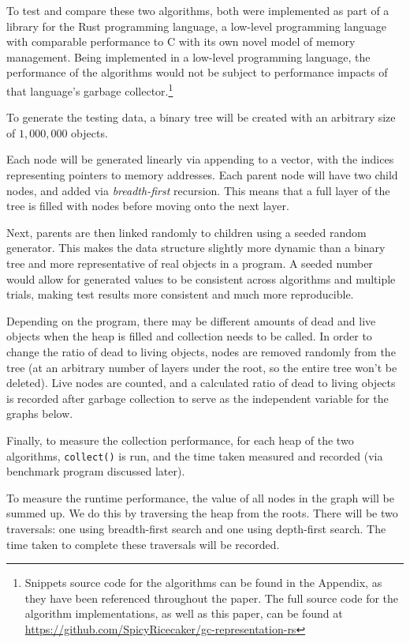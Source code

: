 \documentclass[index]{subfiles}
\begin{document}
To test and compare these two algorithms, both were implemented as part of a library for the Rust programming language, a low-level programming language with comparable performance to C with its own novel model of memory management. Being implemented in a low-level programming language, the performance of the algorithms would not be subject to performance impacts of that language's garbage collector.\footnote{Snippets source code for the algorithms can be found in the Appendix, as they have been referenced throughout the paper. The full source code for the algorithm implementations, as well as this paper, can be found at \href{https://github.com/SpicyRicecaker/gc-representation-rs}{https://github.com/SpicyRicecaker/gc-representation-rs}}

To generate the testing data, a binary tree will be created with an arbitrary size of \(1,000,000\) objects.

Each node will be generated linearly via appending to a vector, with the indices representing pointers to memory addresses. Each parent node will have two child nodes, and added via \textit{breadth-first} recursion. This means that a full layer of the tree is filled with nodes before moving onto the next layer. %

Next, parents are then linked randomly to children using a seeded random generator. This makes the data structure slightly more dynamic than a binary tree and more representative of real objects in a program. A seeded number would allow for generated values to be consistent across algorithms and multiple trials, making test results more consistent and much more reproducible.

Depending on the program, there may be different amounts of dead and live objects when the heap is filled and collection needs to be called. In order to change the ratio of dead to living objects, nodes are removed randomly from the tree (at an arbitrary number of layers under the root, so the entire tree won't be deleted). Live nodes are counted, and a calculated ratio of dead to living objects is recorded after garbage collection to serve as the independent variable for the graphs below.

Finally, to measure the collection performance, for each heap of the two algorithms, \verb+collect()+ is run, and the time taken measured and recorded (via benchmark program discussed later).

To measure the runtime performance, the value of all nodes in the graph will be summed up. We do this by traversing the heap from the roots. There will be two traversals: one using breadth-first search and one using depth-first search. The time taken to complete these traversals will be recorded.
\end{document}
